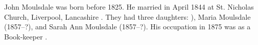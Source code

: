 
John Moulsdale was born before 1825.  He married  in April 1844 at St. Nicholas Church, Liverpool, Lancashire \cite{JohnMoulsdaleMarriage}.
They had three daughters: ), Maria Moulsdale (1857--?), and Sarah Ann Moulsdale (1857--?).
His occupation in 1875 was as a Book-keeper \cite{JohnMoulsdaleOccupation}.
